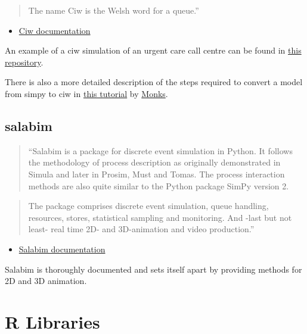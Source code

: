 \documentclass[
  letterpaper,
  DIV=11,
  numbers=noendperiod]{scrreprt}
\providecommand{\tightlist}{%
  \setlength{\itemsep}{0pt}\setlength{\parskip}{0pt}}\usepackage{longtable,booktabs,array}
\begin{document}
\begin{quote}
The name Ciw is the Welsh word for a queue.''
\end{quote}

\begin{itemize}
\tightlist
\item
  \href{https://ciw.readthedocs.io/en/latest/}{Ciw documentation}
\end{itemize}

An example of a ciw simulation of an urgent care call centre can be
found in
\href{https://github.com/TomMonks/ciw-urgent-care-call-centre}{this
repository}.

There is also a more detailed description of the steps required to
convert a model from simpy to ciw in
\href{https://health-data-science-or.github.io/simpy-streamlit-tutorial/content/03_streamlit/13_ciw_backend.html}{this
tutorial} by \href{https://orcid.org/0000-0003-2631-4481}{Monks}.

\subsection{salabim}\label{salabim}

\begin{quote}
``Salabim is a package for discrete event simulation in Python. It
follows the methodology of process description as originally
demonstrated in Simula and later in Prosim, Must and Tomas. The process
interaction methods are also quite similar to the Python package SimPy
version 2.
\end{quote}

\begin{quote}
The package comprises discrete event simulation, queue handling,
resources, stores, statistical sampling and monitoring. And -last but
not least- real time 2D- and 3D-animation and video production.''
\end{quote}

\begin{itemize}
\tightlist
\item
  \href{https://www.salabim.org/manual/Overview.html}{Salabim
  documentation}
\end{itemize}

Salabim is thoroughly documented and sets itself apart by providing
methods for 2D and 3D animation.

\section{R Libraries}\label{r-libraries}
\end{document}
